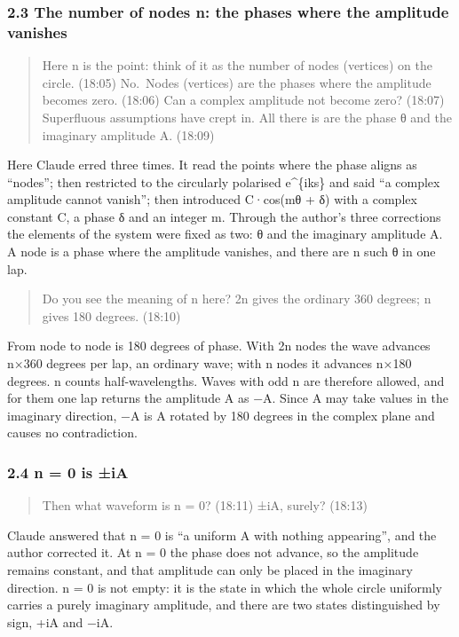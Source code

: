 \documentclass[
  a4paper,
]{article}
\begin{document}
\subsubsection{2.3 The number of nodes n: the phases where the amplitude
vanishes}\label{the-number-of-nodes-n-the-phases-where-the-amplitude-vanishes}

\begin{quote}
Here n is the point: think of it as the number of nodes (vertices) on
the circle. (18:05) No.~Nodes (vertices) are the phases where the
amplitude becomes zero. (18:06) Can a complex amplitude not become zero?
(18:07) Superfluous assumptions have crept in. All there is are the
phase θ and the imaginary amplitude A. (18:09)
\end{quote}

Here Claude erred three times. It read the points where the phase aligns
as ``nodes''; then restricted to the circularly polarised e\^{}\{iks\}
and said ``a complex amplitude cannot vanish''; then introduced C·cos(mθ
+ δ) with a complex constant C, a phase δ and an integer m. Through the
author's three corrections the elements of the system were fixed as two:
θ and the imaginary amplitude A. A node is a phase where the amplitude
vanishes, and there are n such θ in one lap.

\begin{quote}
Do you see the meaning of n here? 2n gives the ordinary 360 degrees; n
gives 180 degrees. (18:10)
\end{quote}

From node to node is 180 degrees of phase. With 2n nodes the wave
advances n×360 degrees per lap, an ordinary wave; with n nodes it
advances n×180 degrees. n counts half-wavelengths. Waves with odd n are
therefore allowed, and for them one lap returns the amplitude A as −A.
Since A may take values in the imaginary direction, −A is A rotated by
180 degrees in the complex plane and causes no contradiction.

\subsubsection{2.4 n = 0 is ±iA}\label{n-0-is-ia}

\begin{quote}
Then what waveform is n = 0? (18:11) ±iA, surely? (18:13)
\end{quote}

Claude answered that n = 0 is ``a uniform A with nothing appearing'',
and the author corrected it. At n = 0 the phase does not advance, so the
amplitude remains constant, and that amplitude can only be placed in the
imaginary direction. n = 0 is not empty: it is the state in which the
whole circle uniformly carries a purely imaginary amplitude, and there
are two states distinguished by sign, +iA and −iA.
\end{document}
